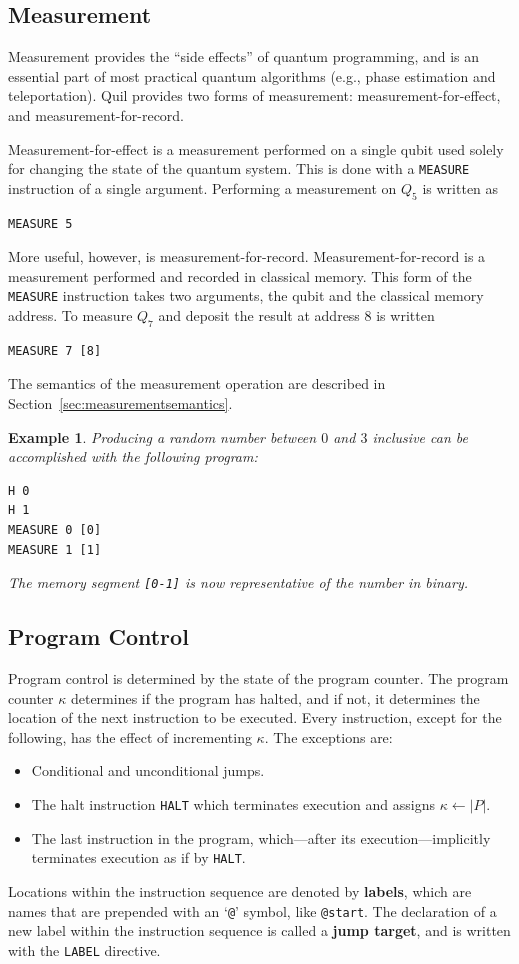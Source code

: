 \documentclass[conference]{IEEEtran}
\newcommand{\defn}[1]{\textbf{#1}}
\newtheorem{example}{Example}
\begin{document}
\subsection{Measurement}
Measurement provides the ``side effects'' of quantum programming, and is an essential part of most practical quantum algorithms (e.g., phase estimation and teleportation). Quil provides two forms of measurement: measurement-for-effect, and measurement-for-record.

Measurement-for-effect is a measurement performed on a single qubit used solely for changing the state of the quantum system. This is done with a \verb|MEASURE| instruction of a single argument. Performing a measurement on $Q_5$ is written as
\begin{verbatim}
MEASURE 5
\end{verbatim}
More useful, however, is measurement-for-record. Measurement-for-record is a measurement performed and recorded in classical memory. This form of the \verb|MEASURE| instruction takes two arguments, the qubit and the classical memory address. To measure $Q_7$ and deposit the result at address $8$ is written
\begin{verbatim}
MEASURE 7 [8]
\end{verbatim}
The semantics of the measurement operation are described in Section~\ref{sec:measurementsemantics}.

\begin{example}
Producing a random number between $0$ and $3$ inclusive can be accomplished with the following program:
\begin{verbatim}
H 0
H 1
MEASURE 0 [0]
MEASURE 1 [1]
\end{verbatim}
The memory segment \verb|[0-1]| is now representative of the number in binary.
\end{example}

\subsection{Program Control}\label{sec:programcontrol}
Program control is determined by the state of the program counter. The program counter $\kappa$ determines if the program has halted, and if not, it determines the location of the next instruction to be executed. Every instruction, except for the following, has the effect of incrementing $\kappa$. The exceptions are:
\begin{itemize}
\item Conditional and unconditional jumps.
\item The halt instruction \verb|HALT| which terminates execution and assigns $\kappa\leftarrow\vert P\vert$.
\item The last instruction in the program, which---after its execution---implicitly terminates execution as if by \verb|HALT|.
\end{itemize}
Locations within the instruction sequence are denoted by \defn{labels}, which are names that are prepended with an `\verb|@|' symbol, like \verb|@start|. The declaration of a new label within the instruction sequence is called a \defn{jump target}, and is written with the \verb|LABEL| directive.
\end{document}
